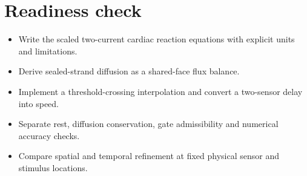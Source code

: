 \documentclass[11pt,letterpaper]{article}
\theoremstyle{definition}\newtheorem{definition}{Definition}\newtheorem{example}{Example}
\numberwithin{equation}{section}
\begin{document}
\section*{Readiness check}
\begin{itemize}
\item Write the scaled two-current cardiac reaction equations with explicit units and limitations.
\item Derive sealed-strand diffusion as a shared-face flux balance.
\item Implement a threshold-crossing interpolation and convert a two-sensor delay into speed.
\item Separate rest, diffusion conservation, gate admissibility and numerical accuracy checks.
\item Compare spatial and temporal refinement at fixed physical sensor and stimulus locations.
\end{itemize}
\end{document}
